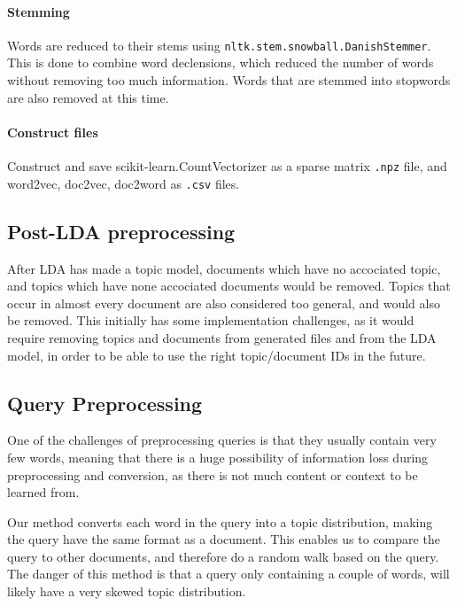 \paragraph{Stemming}
Words are reduced to their stems using \texttt{nltk.stem.snowball.DanishStemmer}. 
This is done to combine word declensions, which reduced the number of words without removing too much information.
Words that are stemmed into stopwords are also removed at this time.

\paragraph{Construct files}
Construct and save scikit-learn.CountVectorizer as a sparse matrix \texttt{.npz} file, and word2vec, doc2vec, doc2word as \texttt{.csv} files.


\subsection{Post-LDA preprocessing}
After LDA has made a topic model, documents which have no accociated topic, and topics which have none accociated documents would be removed.
Topics that occur in almost every document are also considered too general, and would also be removed.
This initially has some implementation challenges, as it would require removing topics and documents from generated files and from the LDA model, in order to be able to use the right topic/document IDs in the future.

\subsection{Query Preprocessing}
One of the challenges of preprocessing queries is that they usually contain very few words, meaning that there is a huge possibility of information loss during preprocessing and conversion, as there is not much content or context to be learned from.

Our method converts each word in the query into a topic distribution, making the query have the same format as a document. 
This enables us to compare the query to other documents, and therefore do a random walk based on the query.
The danger of this method is that a query only containing a couple of words, will likely have a very skewed topic distribution.
